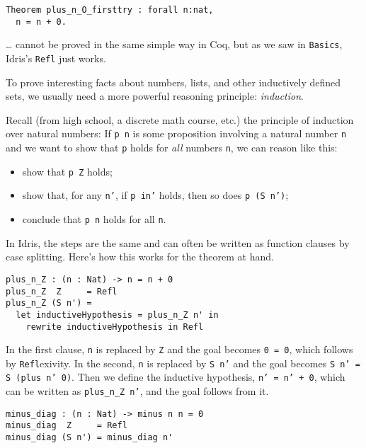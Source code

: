 \begin{verbatim}
Theorem plus_n_O_firsttry : forall n:nat,
  n = n + 0.
\end{verbatim}

\ldots{} cannot be proved in the same simple way in Coq, but as we saw
in \texttt{Basics}, Idris's \texttt{Refl} just
works.

To prove interesting facts about numbers, lists, and other inductively
defined sets, we usually need a more powerful reasoning principle:
\emph{induction}.

Recall (from high school, a discrete math course, etc.) the principle of
induction over natural numbers: If \texttt{p n} is some
proposition involving a natural number \texttt{n} and we
want to show that \texttt{p} holds for \emph{all} numbers
\texttt{n}, we can reason like this:

\begin{itemize}
\tightlist
\item
  show that \texttt{p Z} holds;
\item
  show that, for any \texttt{n'}, if
  \texttt{p in'} holds, then so does
  \texttt{p (S n')};
\item
  conclude that \texttt{p n} holds for all
  \texttt{n}.
\end{itemize}

In Idris, the steps are the same and can often be written as function
clauses by case splitting. Here's how this works for the theorem at
hand.

\begin{verbatim}
plus_n_Z : (n : Nat) -> n = n + 0
plus_n_Z  Z     = Refl
plus_n_Z (S n') =
  let inductiveHypothesis = plus_n_Z n' in
    rewrite inductiveHypothesis in Refl
\end{verbatim}

In the first clause, \texttt{n} is replaced by
\texttt{Z} and the goal becomes
\texttt{0 = 0}, which follows by
\texttt{Refl}exivity. In the second,
\texttt{n} is replaced by \texttt{S n'} and
the goal becomes \texttt{S n' = S (plus n' 0)}. Then we
define the inductive hypothesis, \texttt{n' = n' + 0},
which can be written as \texttt{plus_n_Z n'}, and the goal
follows from it.

\begin{verbatim}
minus_diag : (n : Nat) -> minus n n = 0
minus_diag  Z     = Refl
minus_diag (S n') = minus_diag n'
\end{verbatim}

